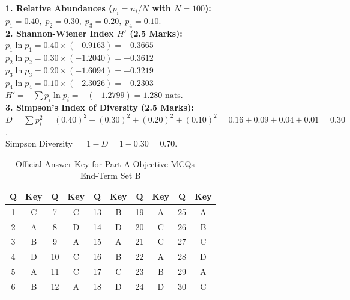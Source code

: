 \begin{solutionbox}
\textbf{1. Relative Abundances ($p_i = n_i / N$ with $N = 100$):}\\
$p_1 = 0.40, \; p_2 = 0.30, \; p_3 = 0.20, \; p_4 = 0.10$.\\
\textbf{2. Shannon-Wiener Index $H'$ (2.5 Marks):}\\
$p_1 \ln p_1 = 0.40 \times (-0.9163) = -0.3665$\\
$p_2 \ln p_2 = 0.30 \times (-1.2040) = -0.3612$\\
$p_3 \ln p_3 = 0.20 \times (-1.6094) = -0.3219$\\
$p_4 \ln p_4 = 0.10 \times (-2.3026) = -0.2303$\\
$H' = -\sum p_i \ln p_i = -(-1.2799) = 1.280\text{ nats}$.\\
\textbf{3. Simpson's Index of Diversity (2.5 Marks):}\\
$D = \sum p_i^2 = (0.40)^2 + (0.30)^2 + (0.20)^2 + (0.10)^2 = 0.16 + 0.09 + 0.04 + 0.01 = 0.30$.\\
$\text{Simpson Diversity } = 1 - D = 1 - 0.30 = 0.70$.
\end{solutionbox}

\begin{table}[h]
\centering\small
\begin{tabular}{|c|c||c|c||c|c||c|c||c|c|}
\hline
\textbf{Q} & \textbf{Key} & \textbf{Q} & \textbf{Key} & \textbf{Q} & \textbf{Key} & \textbf{Q} & \textbf{Key} & \textbf{Q} & \textbf{Key} \\ \hline

1 & C & 7 & C & 13 & B & 19 & A & 25 & A \\ \hline
2 & A & 8 & D & 14 & D & 20 & C & 26 & B \\ \hline
3 & B & 9 & A & 15 & A & 21 & C & 27 & C \\ \hline
4 & D & 10 & C & 16 & B & 22 & A & 28 & D \\ \hline
5 & A & 11 & C & 17 & C & 23 & B & 29 & A \\ \hline
6 & B & 12 & A & 18 & D & 24 & D & 30 & C \\ \hline
\end{tabular}
\caption{Official Answer Key for Part A Objective MCQs --- End-Term Set B}
\end{table}

\newpage
